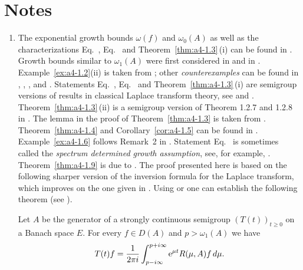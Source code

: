 \section*{Notes}
\begin{enumerate}[label=\emph{Section \arabic*:}, wide, itemsep=1ex]

\item 
The exponential growth bounds $\omega(f)$ and $\omega_{0}(A)$ as well as the characterizations Eq.~, Eq.~ and Theorem~\ref{thm:a4-1.3}\,(i) can be found in \textcite{hillephillips:1957}.
Growth bounds similar to $\omega_{1}(A)$ were first considered in \textcite{djacenko:1976} and in \textcite[Proposition~2]{zabczyk:1979}. 
Example~\ref{ex:a4-1.2}(ii) is taken from \textcite{wolff:1981}; other \emph{counterexamples} can be found in \textcite{hillephillips:1957}, \textcite{foias:1973}, \textcite{triggiani:1975a}, 
\textcite{zabczyk:1975} and \textcite{greinervoigtwolff:1981}. 
Statements Eq.~, Eq.~ and Theorem~\ref{thm:a4-1.3}\,(i) are semigroup versions of results in classical Laplace transform theory, see \textcite{hillephillips:1957} and \textcite{widder:1946}. 
Theorem~\ref{thm:a4-1.3}\,(ii) is a semigroup version of Theorem 1.2.7 and 1.2.8 in \textcite{doetsch:1950}. 
The lemma in the proof of Theorem~\ref{thm:a4-1.3} is taken from \textcite{milstein:1975}. 
Theorem~\ref{thm:a4-1.4} and Corollary~\ref{cor:a4-1.5} can be found in \textcite{neubrander:1985a}. 
Example~\ref{ex:a4-1.6} follows Remark~2 in \textcite{zabczyk:1975}. 
Statement Eq.~ is sometimes called the \emph{spectrum determined growth assumption}, see, for example, \textcite{triggiani:1975b}. 
Theorem~\ref{thm:a4-1.9} is due to \textcite{slemrod:1976}. 
The proof presented here is based on the following sharper version of the inversion formula for the Laplace transform, which improves on the one given in \textcite[p.349]{hillephillips:1957}. 
Using \textcite[p.66]{widder:1946} or \textcite[p.212]{doetsch:1950} one can establish the following theorem (see \textcite{neubrander:1984b}).
\begin{theorem}\label{thm:a4-2.6}
Let $A$ be the generator of a strongly continuous semigroup $(T(t))_{t \geq 0}$ on a Banach space $E$. 
For every $f \in D(A)$ and $p > \omega_{1}(A)$ we have
\[
T(t)f = \frac{1}{2\pi i} \int_{p-i\infty}^{p+i\infty} \mathrm{e}^{\mu t}R(\mu,A)f \, d\mu.
\]
\end{theorem}
 


\end{enumerate}
